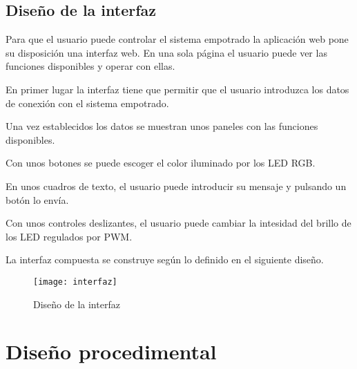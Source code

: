 \subsection{Diseño de la interfaz} \label{sec:design-iface}
Para que el usuario puede controlar el sistema empotrado la aplicación web
pone su disposición una interfaz web. En una sola página el usuario puede
ver las funciones disponibles y operar con ellas.

En primer lugar la interfaz tiene que permitir que el usuario introduzca
los datos de conexión con el sistema empotrado.


Una vez establecidos los datos se muestran unos paneles con las funciones
disponibles.

Con unos botones se puede escoger el color iluminado por los LED RGB.


En unos cuadros de texto, el usuario puede introducir su mensaje y pulsando
un botón lo envía.

Con unos controles deslizantes, el usuario puede cambiar la intesidad del brillo
de los LED regulados por PWM.

\clearpage

La interfaz compuesta se construye según lo definido en el siguiente diseño.

\begin{figure}[H]
  \centering
  \texttt{[image: interfaz]}
  \caption{Diseño de la interfaz} \label{fig:intefaz}
\end{figure}

\section{Diseño procedimental}
